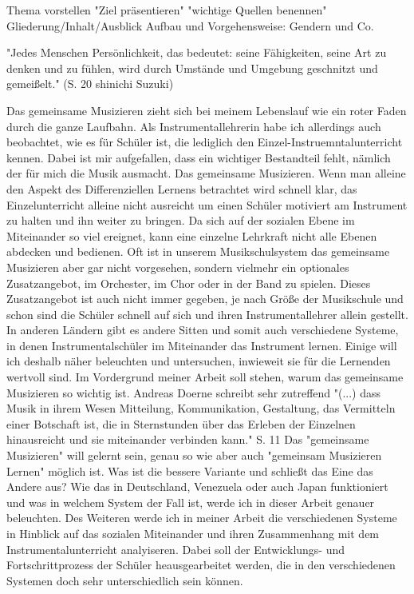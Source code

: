 

Thema vorstellen
"Ziel präsentieren"
"wichtige Quellen benennen"
Gliederung/Inhalt/Ausblick
Aufbau und Vorgehensweise: Gendern und Co. 


"Jedes Menschen Persönlichkeit, das bedeutet: seine Fähigkeiten, seine Art zu
denken und zu fühlen, wird durch Umstände und Umgebung geschnitzt und
gemeißelt." (S. 20 shinichi Suzuki)

Das gemeinsame Musizieren zieht sich bei meinem Lebenslauf wie ein roter Faden
durch die ganze Laufbahn. Als Instrumentallehrerin habe ich allerdings auch
beobachtet, wie es für Schüler ist, die lediglich den
Einzel-Instruemntalunterricht kennen. Dabei ist mir aufgefallen, dass ein
wichtiger Bestandteil fehlt, nämlich der für mich die Musik ausmacht. Das
gemeinsame Musizieren. Wenn man alleine den Aspekt des
Differenziellen Lernens betrachtet wird schnell klar, das Einzelunterricht
alleine nicht ausreicht um einen Schüler motiviert am Instrument zu halten und
ihn weiter zu bringen. Da sich auf der sozialen Ebene im Miteinander so viel
ereignet, kann eine einzelne Lehrkraft nicht alle Ebenen abdecken und bedienen.
Oft ist in unserem Musikschulsystem das gemeinsame Musizieren aber gar nicht
vorgesehen, sondern vielmehr ein optionales Zusatzangebot, im Orchester, im Chor
oder in der Band zu spielen. Dieses Zusatzangebot ist auch nicht immer gegeben,
je nach Größe der Musikschule und schon sind die Schüler schnell auf sich und
ihren Instrumentallehrer allein gestellt. In anderen Ländern gibt es andere
Sitten und somit auch verschiedene Systeme, in denen Instrumentalschüler im
Miteinander das Instrument lernen. Einige will ich deshalb näher beleuchten und
untersuchen, inwieweit sie für die Lernenden wertvoll sind. Im Vordergrund
meiner Arbeit soll stehen, warum das gemeinsame Musizieren so
wichtig ist.
Andreas Doerne schreibt sehr zutreffend "(...) dass Musik in ihrem Wesen Mitteilung, Kommunikation, Gestaltung, das
Vermitteln einer Botschaft ist, die in Sternstunden über das Erleben der
Einzelnen hinausreicht und sie miteinander verbinden kann." S. 11
Das "gemeinsame Musizieren" will gelernt sein, genau so wie 
aber auch "gemeinsam Musizieren Lernen" möglich ist. Was ist die bessere
Variante und schließt das Eine das Andere aus? Wie das in Deutschland,
Venezuela oder auch Japan funktioniert und was in welchem System der Fall ist, werde ich in dieser Arbeit
genauer beleuchten. Des Weiteren werde ich in meiner Arbeit die verschiedenen
Systeme in Hinblick auf das sozialen Miteinander und ihren Zusammenhang mit
dem Instrumentalunterricht analyiseren. Dabei soll der Entwicklungs- und
Fortschrittprozess der Schüler heausgearbeitet werden, die in den verschiedenen Systemen doch sehr unterschiedlich sein
können.

